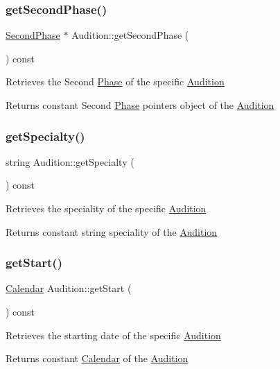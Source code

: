 \subsubsection{\texorpdfstring{get\+Second\+Phase()}{getSecondPhase()}}
{\footnotesize\ttfamily \hyperlink{class_second_phase}{Second\+Phase} $\ast$ Audition\+::get\+Second\+Phase (\begin{DoxyParamCaption}{ }\end{DoxyParamCaption}) const}

Retrieves the Second \hyperlink{class_phase}{Phase} of the specific \hyperlink{class_audition}{Audition} \begin{DoxyReturn}{Returns}
constant Second \hyperlink{class_phase}{Phase} pointer\textquotesingle{}s object of the \hyperlink{class_audition}{Audition} 
\end{DoxyReturn}
\mbox{\label{class_audition_aaa7cac841f79eec747981194046818f5}} 
\subsubsection{\texorpdfstring{get\+Specialty()}{getSpecialty()}}
{\footnotesize\ttfamily string Audition\+::get\+Specialty (\begin{DoxyParamCaption}{ }\end{DoxyParamCaption}) const}

Retrieves the speciality of the specific \hyperlink{class_audition}{Audition} \begin{DoxyReturn}{Returns}
constant string speciality of the \hyperlink{class_audition}{Audition} 
\end{DoxyReturn}
\mbox{\label{class_audition_ac4fc745ecaa9e6975dab7ed779d732d0}} 
\subsubsection{\texorpdfstring{get\+Start()}{getStart()}}
{\footnotesize\ttfamily \hyperlink{class_calendar}{Calendar} Audition\+::get\+Start (\begin{DoxyParamCaption}{ }\end{DoxyParamCaption}) const}

Retrieves the starting date of the specific \hyperlink{class_audition}{Audition} \begin{DoxyReturn}{Returns}
constant \hyperlink{class_calendar}{Calendar} of the \hyperlink{class_audition}{Audition} 
\end{DoxyReturn}
\mbox{\label{class_audition_a608be9eeff1801eaa956d6d831c8085f}} 
